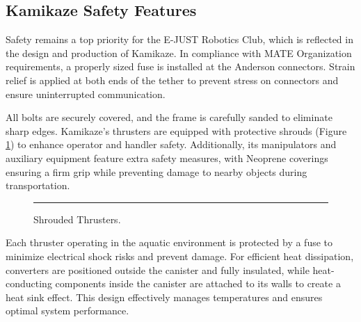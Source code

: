 \subsection{Kamikaze Safety Features}

Safety remains a top priority for the E-JUST Robotics Club, which is reflected in the design and production of Kamikaze. In compliance with MATE Organization requirements, a properly sized fuse is installed at the Anderson connectors. Strain relief is applied at both ends of the tether to prevent stress on connectors and ensure uninterrupted communication.

All bolts are securely covered, and the frame is carefully sanded to eliminate sharp edges. Kamikaze’s thrusters are equipped with protective shrouds (Figure \ref{fig:shrouds}) to enhance operator and handler safety. Additionally, its manipulators and auxiliary equipment feature extra safety measures, with Neoprene coverings ensuring a firm grip while preventing damage to nearby objects during transportation.

\begin{figure}[h]
    \centering
    \rule{0.8\columnwidth}{4cm}
    \caption{Shrouded Thrusters.}
    \label{fig:shrouds}
\end{figure}

Each thruster operating in the aquatic environment is protected by a fuse to minimize electrical shock risks and prevent damage. For efficient heat dissipation, converters are positioned outside the canister and fully insulated, while heat-conducting components inside the canister are attached to its walls to create a heat sink effect. This design effectively manages temperatures and ensures optimal system performance.
